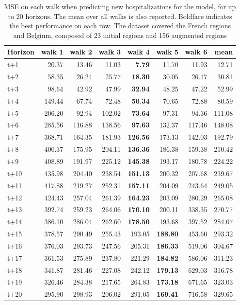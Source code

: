 \begin{table}[H]
\centering
\caption{MSE on each walk when predicting new hospitalizations for the model, for up to 20 horizons. The mean over all walks is also reported. Boldface indicates the best performance on each row. The dataset covered the French regions and Belgium, composed of 23 initial regions and 156 augmented regions }
\label{tab:MSE_walk_dense_model}
\begin{tabular}{lrrrrrrr}
\toprule
Horizon &  walk 1 &  walk 2 &  walk 3 &  walk 4 &  walk 5 &  walk 6 &   mean \\
\midrule
t+1  & 20.37  & 13.46  & 11.03  & \textbf{7.79}  & 11.70  & 11.93  & 12.71  \\
t+2  & 58.35  & 26.24  & 25.77  & \textbf{18.30}  & 30.05  & 26.17  & 30.81  \\
t+3  & 98.64  & 42.92  & 47.99  & \textbf{32.94}  & 48.25  & 47.22  & 52.99  \\
t+4  & 149.44  & 67.74  & 72.48  & \textbf{50.34}  & 70.65  & 72.88  & 80.59  \\
t+5  & 206.20  & 92.94  & 102.02  & \textbf{73.64}  & 97.31  & 94.36  & 111.08  \\
t+6  & 285.56  & 116.88  & 138.56  & \textbf{97.63}  & 132.37  & 117.46  & 148.08  \\
t+7  & 368.71  & 164.35  & 181.93  & \textbf{126.56}  & 173.13  & 142.03  & 192.79  \\
t+8  & 400.37  & 175.95  & 204.11  & \textbf{136.36}  & 186.38  & 159.38  & 210.42  \\
t+9  & 408.89  & 191.97  & 225.12  & \textbf{145.38}  & 193.17  & 180.78  & 224.22  \\
t+10  & 435.98  & 204.40  & 238.54  & \textbf{151.13}  & 200.32  & 207.68  & 239.67  \\
t+11  & 417.88  & 219.27  & 252.31  & \textbf{157.11}  & 204.09  & 243.64  & 249.05  \\
t+12  & 424.43  & 257.04  & 261.39  & \textbf{164.23}  & 203.09  & 280.29  & 265.08  \\
t+13  & 392.74  & 259.23  & 264.06  & \textbf{170.10}  & 200.11  & 338.35  & 270.77  \\
t+14  & 386.10  & 286.04  & 262.60  & \textbf{178.50}  & 193.68  & 397.52  & 284.07  \\
t+15  & 378.57  & 290.49  & 255.43  & 193.05  & \textbf{188.80}  & 453.60  & 293.32  \\
t+16  & 376.03  & 293.73  & 247.56  & 205.31  & \textbf{186.33}  & 519.06  & 304.67  \\
t+17  & 361.53  & 275.89  & 237.80  & 221.29  & \textbf{184.82}  & 586.06  & 311.23  \\
t+18  & 341.87  & 281.46  & 227.08  & 242.12  & \textbf{179.13}  & 629.03  & 316.78  \\
t+19  & 326.46  & 284.38  & 217.65  & 264.83  & \textbf{173.18}  & 671.65  & 323.03  \\
t+20  & 295.90  & 298.93  & 206.02  & 291.05  & \textbf{169.41}  & 716.58  & 329.65  \\

\bottomrule
\end{tabular}
\end{table}
